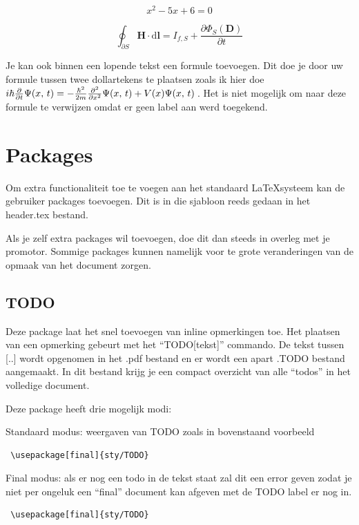 \begin{equation} \label{eq:polynoom}
x^2 - 5 x + 6 = 0
\end{equation}

\begin{equation} \label{eq:maxwell}
\oint_{\partial S} \mathbf{H} \cdot \mathrm{d}\mathbf{l} = I_{f,S} + \frac {\partial \Phi_S(\mathbf D)}{\partial t} 
\end{equation}

Je kan ook binnen een lopende tekst een formule toevoegen. Dit doe je door uw formule tussen twee dollartekens te plaatsen zoals ik hier doe $i \hbar {\partial \over \partial t} \Psi(x,\,t)= -{\hbar^2  \over 2m} {\partial^2 \over \partial x^2} \Psi(x,\,t)+ V(x)\Psi(x,\,t)\,$. Het is niet mogelijk om naar deze formule te verwijzen omdat er geen label aan werd toegekend.


\section{Packages}
Om extra functionaliteit toe te voegen aan het standaard \LaTeX systeem kan de gebruiker packages toevoegen. Dit is in die sjabloon reeds gedaan in het header.tex bestand.

Als je zelf extra packages wil toevoegen, doe dit dan steeds in overleg met je promotor. Sommige packages kunnen namelijk voor te grote veranderingen van de opmaak van het document zorgen.


\subsection{TODO}

Deze package laat het snel toevoegen van inline opmerkingen toe.
Het plaatsen van een opmerking gebeurt met het ``TODO[tekst]'' commando.
De tekst tussen [..] wordt opgenomen in het .pdf bestand en er wordt een apart .TODO bestand aangemaakt. 
In dit bestand krijg je een compact overzicht van alle ``todos'' in het volledige document.


Deze package heeft drie mogelijk modi:

Standaard modus: weergaven van TODO zoals in bovenstaand voorbeeld
\begin{verbatim}
 \usepackage[final]{sty/TODO}
\end{verbatim}

Final modus: als er nog een todo in de tekst staat zal dit een error geven zodat je niet per ongeluk een ``final'' document kan afgeven met de TODO label er nog in.
\begin{verbatim}
 \usepackage[final]{sty/TODO}
\end{verbatim}

